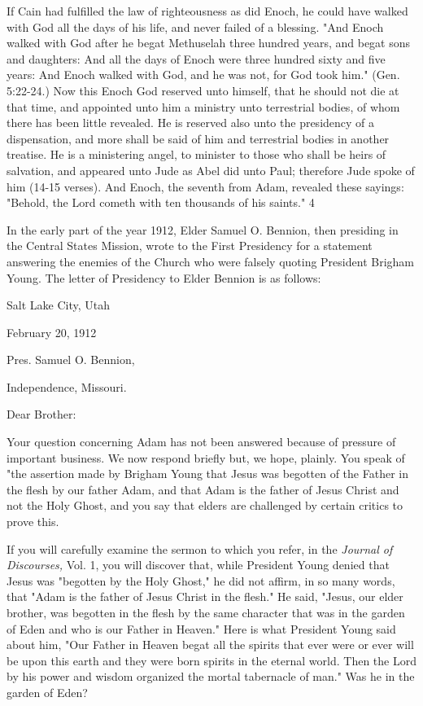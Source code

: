 If Cain had fulfilled the law of righteousness as did Enoch, he could have walked with God
all the days of his life, and never failed of a blessing. "And Enoch walked with God after he
begat Methuselah three hundred years, and begat sons and daughters: And all the days of
Enoch were three hundred sixty and five years: And Enoch walked with God, and he was not,
for God took him." (Gen. 5:22-24.) Now this Enoch God reserved unto himself, that he
should not die at that time, and appointed unto him a ministry unto terrestrial bodies, of
whom there has been little revealed. He is reserved also unto the presidency of a
dispensation, and more shall be said of him and terrestrial bodies in another treatise. He is a
ministering angel, to minister to those who shall be heirs of salvation, and appeared unto
Jude as Abel did unto Paul; therefore Jude spoke of him (14-15 verses). And Enoch, the
seventh from Adam, revealed these sayings: "Behold, the Lord cometh with ten thousands of
his saints." 4

In the early part of the year 1912, Elder Samuel O. Bennion, then presiding in the Central
States Mission, wrote to the First Presidency for a statement answering the enemies of the
Church who were falsely quoting President Brigham Young. The letter of Presidency to
Elder Bennion is as follows:

Salt Lake City, Utah

February 20, 1912

Pres. Samuel O. Bennion,

Independence, Missouri.

Dear Brother:

Your question concerning Adam has not been answered because of pressure of important
business. We now respond briefly but, we hope, plainly. You speak of "the assertion made by
Brigham Young that Jesus was begotten of the Father in the flesh by our father Adam, and
that Adam is the father of Jesus Christ and not the Holy Ghost, and you say that elders are
challenged by certain critics to prove this.

If you will carefully examine the sermon to which you refer, in the \textit{Journal of Discourses,}
Vol. 1, you will discover that, while President Young denied that Jesus was "begotten by the
Holy Ghost," he did not affirm, in so many words, that "Adam is the father of Jesus Christ in
the flesh." He said, "Jesus, our elder brother, was begotten in the flesh by the same character
that was in the garden of Eden and who is our Father in Heaven." Here is what President
Young said about him, "Our Father in Heaven begat all the spirits that ever were or ever will
be upon this earth and they were born spirits in the eternal world. Then the Lord by his power
and wisdom organized the mortal tabernacle of man." Was he in the garden of Eden?


